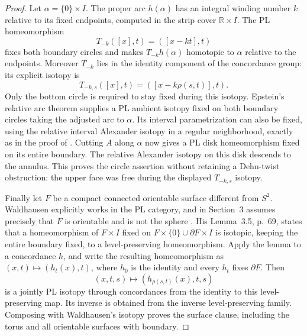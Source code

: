 \begin{proof}
Let $\alpha=\{0\}\times I$. The proper arc $h(\alpha)$ has
an integral winding number $k$ relative to its fixed endpoints,
computed in the strip cover $\mathbb R\times I$.
The PL homeomorphism
\[
 T_{-k}([x],t)=([x-kt],t)
\]
fixes both boundary circles and makes $T_{-k}h(\alpha)$
homotopic to $\alpha$ relative to the endpoints. Moreover
$T_{-k}$ lies in the identity component of the concordance
group: its explicit isotopy is
\[
 T_{-k,s}([x],t)=([x-k\rho(s,t)],t).
\]
Only the bottom circle is required to stay fixed during this
isotopy. Epstein's relative arc theorem
\cite[Theorem~3.1, p.~89]{Epstein1966} supplies a PL ambient
isotopy fixed on both boundary circles taking the adjusted arc
to $\alpha$. Its interval parametrization can also be fixed,
using the relative interval Alexander isotopy in a regular
neighborhood, exactly as in the proof of
\cite[Theorem~3.4, p.~91]{Epstein1966}.
Cutting $A$ along $\alpha$ now gives a PL disk homeomorphism
fixed on its entire boundary. The relative Alexander isotopy
on this disk descends to the annulus. This proves the circle
assertion without retaining a Dehn-twist obstruction: the
upper face was free during the displayed $T_{-k,s}$ isotopy.

Finally let $F$ be a compact connected orientable surface
different from $S^2$. Waldhausen explicitly works in the PL
category, and in Section~3 assumes precisely that $F$ is
orientable and is not the sphere
\cite[pp.~56,65]{Waldhausen1968}. His Lemma~3.5, p.~69,
states that a homeomorphism of $F\times I$ fixed on
$F\times\{0\}\cup\partial F\times I$ is isotopic, keeping
the entire boundary fixed, to a level-preserving homeomorphism.
Apply the lemma to a concordance $h$, and write the resulting
homeomorphism as $(x,t)\mapsto(h_t(x),t)$, where $h_0$ is the
identity and every $h_t$ fixes $\partial F$.
Then
\[
 (x,t,s)\longmapsto(h_{\rho(s,t)}(x),t,s)
\]
is a jointly PL isotopy through concordances from the identity
to this level-preserving map. Its inverse is obtained from the
inverse level-preserving family. Composing with Waldhausen's
isotopy proves the surface clause, including the torus and all
orientable surfaces with boundary.


\end{proof}
